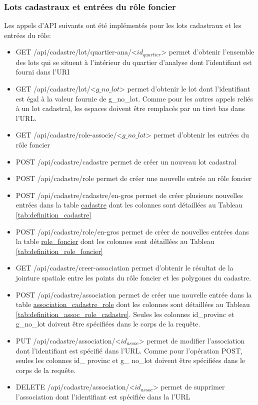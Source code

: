 \subsubsection{Lots cadastraux et entrées du rôle foncier}
Les appels d'\ac{API} suivants ont été implémentés pour les lots cadastraux et les entrées du rôle:
\begin{itemize}
    \item GET /api/cadastre/lot/quartier-ana/<$id_{quartier}$> permet d'obtenir l'ensemble des lots qui se situent à l'intérieur du quartier d'analyse dont l'identifiant est fourni dans l'\ac{URI}
    \item GET /api/cadastre/lot/<$g\_no\_lot$> permet d'obtenir le lot dont l'identifiant est égal à la valeur fournie de g\_no\_lot. Comme pour les autres appels reliés à un lot cadastral, les espaces doivent être remplacés par un tiret bas dans l'\ac{URL}.
    \item GET /api/cadastre/role-associe/<$g\_no\_lot$> permet d'obtenir les entrées du rôle foncier 
    \item POST /api/cadastre/cadastre permet de créer un nouveau lot cadastral
    \item POST /api/cadastre/role permet de créer une nouvelle entrée au rôle foncier
    \item POST /api/cadastre/cadastre/en-gros permet de créer plusieurs nouvelles entrées dans la table \ul{cadastre} dont les colonnes sont détaillées au Tableau \ref{tab:definition_cadastre}
    \item POST /api/cadastre/role/en-gros permet de créer de nouvelles entrées dans la table \ul{role\_foncier} dont les colonnes sont détaillées au Tableau \ref{tab:definition_role_foncier}
    \item GET /api/cadastre/creer-association permet d'obtenir le résultat de la jointure spatiale entre les points du rôle foncier et les polygones du cadastre. 
    \item POST /api/cadastre/association permet de créer une nouvelle entrée dans la table \ul{association\_cadastre\_role} dont les colonnes sont détaillées au Tableau \ref{tab:definition_assoc_role_cadastre}. Seules les colonnes id\_provinc et g\_no\_lot doivent être spécifiées dans le corps de la requête.
    \item PUT /api/cadastre/association/<$id_{assoc}$> permet de modifier l'association dont l'identifiant est spécifié dans l'\ac{URL}. Comme pour l'opération POST, seules les colonnes id\_ provinc et g\_ no\_lot doivent être spécifiées dans le corps de la requête.
    \item DELETE /api/cadastre/association/<$id_{assoc}$> permet de supprimer l'association dont l'identifiant est spécifiée dans la l'\ac{URL}
\end{itemize}
